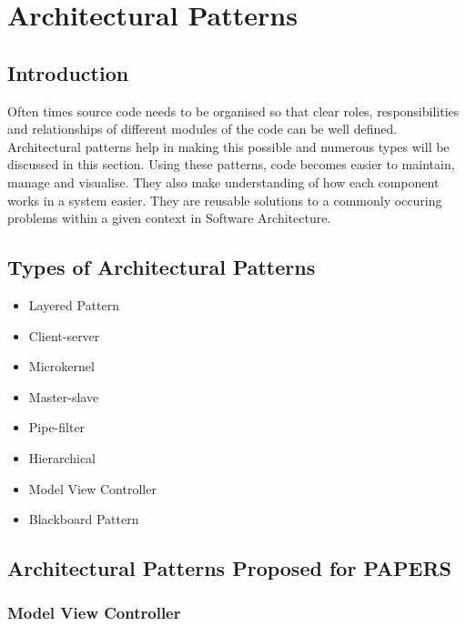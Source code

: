 \documentclass{article}
\begin{document}
\cleardoublepage
\section{Architectural Patterns}

\subsection{Introduction}
Often times source code needs to be organised so that clear roles, responsibilities and relationships of different modules of the code can be well defined. Architectural patterns help in making this possible and numerous types will be discussed in this section. Using these patterns, code becomes easier to maintain, manage and visualise. They also make understanding of how each component works in a system easier. They are reusable solutions to a commonly occuring problems within a given context in Software Architecture.

\subsection{Types of Architectural Patterns}

\begin{itemize}
\item Layered Pattern
\item Client-server
\item Microkernel
\item Master-slave
\item Pipe-filter
\item Hierarchical
\item Model View Controller
\item Blackboard Pattern
\end{itemize}

\subsection{Architectural Patterns Proposed for PAPERS}


\subsubsection{Model View Controller}
\end{document}
